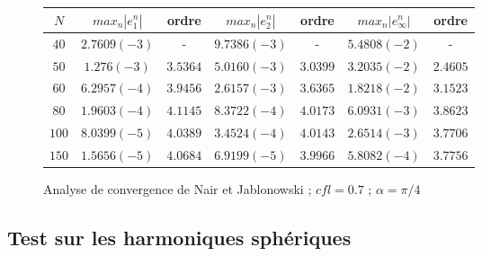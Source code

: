 \begin{figure}
\begin{tabular}{c||cc|cc|cc}
$N$ & $max_n |e_1^n|$ & ordre  & $max_n |e_2^n|$ & ordre  & $max_n |e_{\infty}^n|$ & ordre \\
\hline
\hline
$40$ & $2.7609 (-3)$ & -  & $9.7386 (-3)$ & - & $5.4808 (-2)$  & - \\
\hline 
$50$ & $1.276 (-3)$ & $3.5364$ & $5.0160 (-3)$ & $3.0399$ & $3.2035 (-2)$ & $2.4605$ \\
\hline
$60$ & $6.2957 (-4)$ & $3.9456$ & $2.6157 (-3)$ & $3.6365$ & $1.8218 (-2)$ & $3.1523$ \\
\hline
$80$ & $1.9603 (-4) $ & $4.1145$ & $8.3722 (-4)$ & $4.0173$ & $6.0931 (-3)$ & $3.8623$ \\
\hline
$100$ & $8.0399 (-5)$ & $4.0389$ & $3.4524 (-4)$ & $4.0143$ & $2.6514 (-3)$ & $3.7706$\\
\hline
$150$ & $1.5656 (-5)$ & $4.0684$ & $6.9199 (-5)$ & $3.9966$ & $5.8082 (-4)$ & $3.7756$
\end{tabular}
\caption{Analyse de convergence de Nair et Jablonowski \cite{Nair2008} ; $cfl = 0.7$ ; $\alpha = \pi /4$}
\end{figure}


\subsection{Test sur les harmoniques sphériques}
